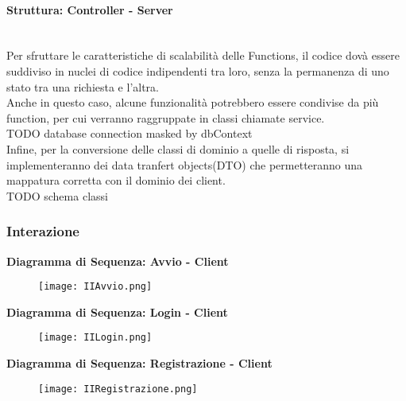 \paragraph{Struttura: Controller - Server}\mbox{}\\
Per sfruttare le caratteristiche di scalabilità delle Functions, il codice dovà essere suddiviso in nuclei di codice indipendenti tra loro, senza la permanenza di uno stato tra una richiesta e l'altra.\\
Anche in questo caso, alcune funzionalità potrebbero essere condivise da più function, per cui verranno raggruppate in classi chiamate service.\\
TODO database connection masked by dbContext \\
Infine, per la conversione delle classi di dominio a quelle di risposta, si implementeranno dei data tranfert objects(DTO) che permetteranno una mappatura corretta con il dominio dei client.\\
TODO schema classi \\

\clearpage
\subsubsection{Interazione}

\textbf{Diagramma di Sequenza: Avvio - Client}\\
\begin{figure}[h!]
    \begin{center}
        \texttt{[image: IIAvvio.png]}
    \end{center}
\end{figure}

\textbf{Diagramma di Sequenza: Login - Client}\\
\begin{figure}[h!]
    \begin{center}
        \texttt{[image: IILogin.png]}
    \end{center}
\end{figure}
\clearpage

\textbf{Diagramma di Sequenza: Registrazione - Client}\\
\begin{figure}[h!]
    \begin{center}
        \texttt{[image: IIRegistrazione.png]}
    \end{center}
\end{figure}


